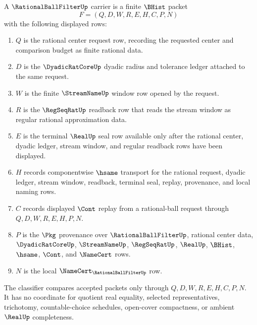 \begin{definition}
\label{def:rational-ball-filter-carrier}
A $\RationalBallFilterUp$ carrier is a finite $\BHist$ packet
$$
F=(Q,D,W,R,E,H,C,P,N)
$$
with the following displayed rows:
\begin{enumerate}
\item $Q$ is the rational center request row, recording the requested center and comparison budget as finite rational data.
\item $D$ is the $\DyadicRatCoreUp$ dyadic radius and tolerance ledger attached to the same request.
\item $W$ is the finite $\StreamNameUp$ window row opened by the request.
\item $R$ is the $\RegSeqRatUp$ readback row that reads the stream window as regular rational approximation data.
\item $E$ is the terminal $\RealUp$ seal row available only after the rational center, dyadic ledger, stream window, and regular readback rows have been displayed.
\item $H$ records componentwise $\hsame$ transport for the rational request, dyadic ledger, stream window, readback, terminal seal, replay, provenance, and local naming rows.
\item $C$ records displayed $\Cont$ replay from a rational-ball request through $Q,D,W,R,E,H,P,N$.
\item $P$ is the $\Pkg$ provenance over $\RationalBallFilterUp$, rational center data, $\DyadicRatCoreUp$, $\StreamNameUp$, $\RegSeqRatUp$, $\RealUp$, $\BHist$, $\hsame$, $\Cont$, and $\NameCert$ rows.
\item $N$ is the local $\NameCert_{\RationalBallFilterUp}$ row.
\end{enumerate}
The classifier compares accepted packets only through $Q,D,W,R,E,H,C,P,N$. It has no coordinate for quotient real equality, selected representatives, trichotomy, countable-choice schedules, open-cover compactness, or ambient $\RealUp$ completeness.
\end{definition}

